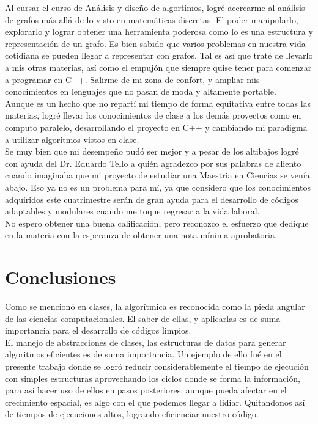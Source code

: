 \documentclass[oneside,onecolumn]{article}
\begin{document}
Al cursar el curso de Análisis y diseño de algortimos, logré acercarme al análisis de grafos más allá de lo visto en matemáticas discretas. El poder manipularlo, explorarlo y lograr obtener una herramienta poderosa como lo es una estructura y representación de un grafo. Es bien sabido que varios problemas en nuestra vida cotidiana se pueden llegar a representar con grafos. Tal es así que traté de llevarlo a mis otras materias, así como el empujón que siempre quise tener para comenzar a programar en C++. Salirme de mi zona de confort, y ampliar mis conocimientos en lenguajes que no pasan de moda y altamente portable.\\

Aunque es un hecho que no repartí mi tiempo de forma equitativa entre todas las materias, logré llevar los conocimientos de clase a los demás proyectos como en computo paralelo, desarrollando el proyecto en C++ y cambiando mi paradigma a utilizar algoritmos vistos en clase.\\

Se muy bien que mi desempeño pudó ser mejor y a pesar de los altibajos logré con ayuda del Dr. Eduardo Tello a quién agradezco por sus palabras de aliento cuando imaginaba que mi proyecto de estudiar una Maestria en Ciencias se venía abajo. Eso ya no es un problema para mí, ya que considero que los conocimientos adquiridos este cuatrimestre serán de gran ayuda para el desarrollo de códigos adaptables y modulares cuando me toque regresar a la vida laboral.\\

No espero obtener una buena calificación, pero reconozco el esfuerzo que dedique en la materia con la esperanza de obtener una nota mínima aprobatoria.

\section{Conclusiones}

Como se mencionó en clases, la algorítmica es reconocida como la pieda angular de las ciencias computacionales. El saber de ellas, y aplicarlas es de suma importancia para el desarrollo de códigos limpios.\\

El manejo de abstracciones de clases, las estructuras de datos para generar algoritmos eficientes es de suma importancia. Un ejemplo de ello fué en el presente trabajo donde se logró reducir considerablemente el tiempo de ejecución con simples estructuras aprovechando los ciclos donde se forma la información, para así hacer uso de ellos en pasos posteriores, aunque pueda afectar en el crecimiento espacial, es algo con el que podemos llegar a lidiar. Quitandonos así de tiempos de ejecuciones altos, logrando eficienciar nuestro código.
\end{document}
